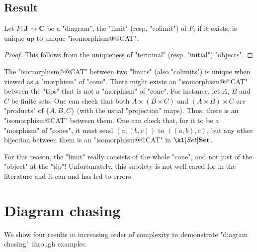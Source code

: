 \documentclass[main.tex]{subfiles}
\begin{document}
\subsection{Result}
\begin{prop}[Uniqueness]
    Let $F: \mathbf{J} \rightsquigarrow \mathbf{C}$ be a "diagram", the "limit" (resp. "colimit") of $F$, if it exists, is unique up to unique "isomorphism@@CAT".
\end{prop}
\begin{proof}
    This follows from the uniqueness of "terminal" (resp. "initial") "objects".
\end{proof}
\begin{rem}\label{rem:uniqueiso}
    The "isomorphism@@CAT" between two "limits" (also "colimits") is unique when viewed as a "morphism" of "cone". There might exists an "isomorphism@@CAT" between the "tips" that is not a "morphism" of "cone". For instance, let $A$, $B$ and $C$ be finite sets. One can check that both $A \times (B \times C)$ and $(A\times B) \times C$ are "products" of $\{A, B, C\}$ (with the usual "projection" maps). Thus, there is an "isomorphism@CAT" between them. One can check that, for it to be a "morphism" of "cones", it must send $(a, (b,c))$ to $((a,b), c)$, but any other bijection between them is an "isomorphism@@CAT" in $\catSet$.
    
    For this reason, the "limit" really consists of the whole "cone", and not just of the "object" at the "tip"! Unfortunately, this subtlety is not well cared for in the literature and it can and has led to errors.
\end{rem}

\section{Diagram chasing}
We show four results in increasing order of complexity to demonstrate "diagram chasing" through examples.
\end{document}
